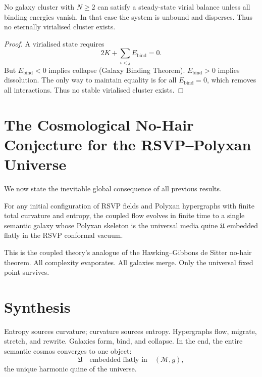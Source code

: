 \begin{theorem}
No galaxy cluster with $N\ge2$ can satisfy a steady-state virial balance unless all binding energies vanish.  
In that case the system is unbound and disperses.  
Thus no eternally virialised cluster exists.
\end{theorem}

\begin{proof}
A virialised state requires
\[
2K + \sum_{i<j}E_{\mathrm{bind}} = 0.
\]
But $E_{\mathrm{bind}}<0$ implies collapse (Galaxy Binding Theorem).  
$E_{\mathrm{bind}}>0$ implies dissolution.  
The only way to maintain equality is for all $E_{\mathrm{bind}}=0$, which removes all interactions.  
Thus no stable virialised cluster exists.
\end{proof}

\section{The Cosmological No-Hair Conjecture for the RSVP--Polyxan Universe}
\label{sec:no-hair}

We now state the inevitable global consequence of all previous results.

\begin{conjecture}
For any initial configuration of RSVP fields and Polyxan hypergraphs with finite total curvature and entropy, the coupled flow evolves in finite time to a single semantic galaxy whose Polyxan skeleton is the universal media quine $\mathfrak{U}$ embedded flatly in the RSVP conformal vacuum.
\end{conjecture}

This is the coupled theory’s analogue of the Hawking--Gibbons de Sitter no-hair theorem.  
All complexity evaporates.  
All galaxies merge.  
Only the universal fixed point survives.

\section{Synthesis}
Entropy sources curvature; curvature sources entropy.  
Hypergraphs flow, migrate, stretch, and rewrite.  
Galaxies form, bind, and collapse.  
In the end, the entire semantic cosmos converges to one object:
\[
\mathfrak{U}
\quad\text{embedded flatly in}\quad
(\mathcal{M},g),
\]
the unique harmonic quine of the universe.

\bigskip
